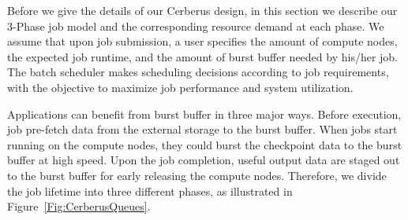 Before we give the details of our Cerberus design, 
in this section we describe our 3-Phase job model 
and the corresponding resource demand at each phase. 
We assume that upon job submission, 
a user specifies the amount of compute nodes, 
the expected job runtime, 
and the amount of burst buffer needed by his/her job. 
The batch scheduler makes scheduling decisions according to job requirements, 
with the objective to maximize job performance and system utilization.





Applications can benefit from burst buffer in three major ways\cite{BBUseCase}.
Before execution, job pre-fetch data from the external storage to the burst buffer.
When jobs start running on the compute nodes,
they could burst the checkpoint data to the burst buffer at high speed.
Upon the job completion, 
useful output data are staged out to the burst buffer for early releasing the compute nodes.
Therefore, we divide the job lifetime into three different phases, as illustrated in Figure~\ref{Fig:CerberusQueues}. 
 
